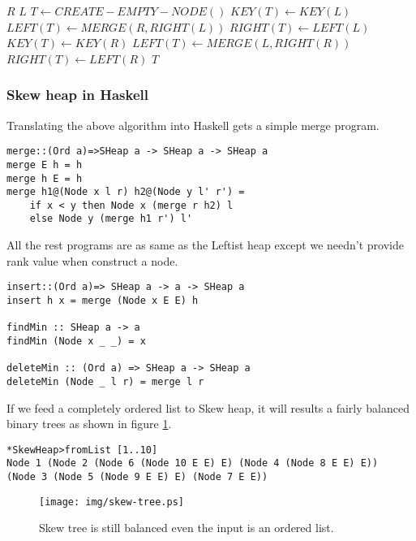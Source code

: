 \documentclass{article}
\begin{document}
\begin{algorithmic}[1]
    \State \Return $R$
    \State \Return $L$
  \Else
    \State $T \gets CREATE-EMPTY-NODE()$
      \State $KEY(T) \gets KEY(L)$
      \State $LEFT(T) \gets MERGE(R, RIGHT(L))$
      \State $RIGHT(T) \gets LEFT(L)$
    \Else
      \State $KEY(T) \gets KEY(R)$
      \State $LEFT(T) \gets MERGE(L, RIGHT(R))$
      \State $RIGHT(T) \gets LEFT(R)$
    \EndIf
    \State \Return $T$
  \EndIf
\EndFunction
\end{algorithmic}

\subsubsection*{Skew heap in Haskell}

Translating the above algorithm into Haskell gets a simple merge program.

\lstset{language=Haskell}
\begin{lstlisting}
merge::(Ord a)=>SHeap a -> SHeap a -> SHeap a
merge E h = h
merge h E = h
merge h1@(Node x l r) h2@(Node y l' r') = 
    if x < y then Node x (merge r h2) l
    else Node y (merge h1 r') l'
\end{lstlisting}

All the rest programs are as same as the Leftist heap except we needn't
provide rank value when construct a node. 

\begin{lstlisting}
insert::(Ord a)=> SHeap a -> a -> SHeap a
insert h x = merge (Node x E E) h

findMin :: SHeap a -> a
findMin (Node x _ _) = x

deleteMin :: (Ord a) => SHeap a -> SHeap a
deleteMin (Node _ l r) = merge l r
\end{lstlisting}

If we feed a completely ordered list to Skew heap, it will results a
fairly balanced binary trees as shown in figure \ref{fig:skew-tree}.

\begin{lstlisting}
*SkewHeap>fromList [1..10]
Node 1 (Node 2 (Node 6 (Node 10 E E) E) (Node 4 (Node 8 E E) E)) 
(Node 3 (Node 5 (Node 9 E E) E) (Node 7 E E))
\end{lstlisting}

\begin{figure}[htbp]
   \begin{center}
   	  \texttt{[image: img/skew-tree.ps]}
    \caption{Skew tree is still balanced even the input is an ordered list.} \label{fig:skew-tree}
   \end{center}
\end{figure}
\end{document}
